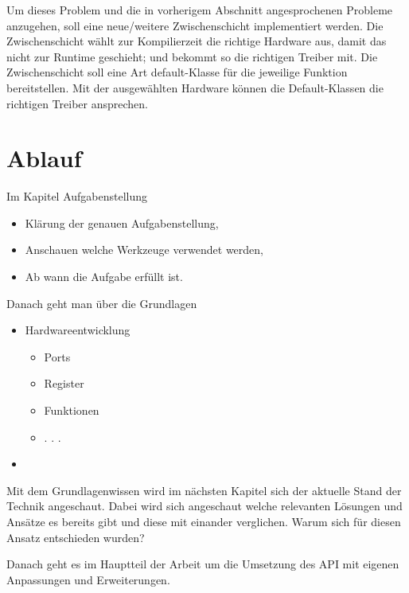 Um dieses Problem und die in vorherigem Abschnitt angesprochenen Probleme anzugehen, soll eine neue/weitere Zwischenschicht implementiert werden. 
Die Zwischenschicht wählt zur Kompilierzeit die richtige Hardware aus, damit das nicht zur Runtime geschieht; und bekommt so die richtigen Treiber mit.
Die Zwischenschicht soll eine Art default-Klasse für die jeweilige Funktion bereitstellen.
Mit der ausgewählten Hardware können die Default-Klassen die richtigen Treiber ansprechen.



\section{Ablauf}
Im Kapitel Aufgabenstellung
	\begin{itemize}
		\item Klärung der genauen Aufgabenstellung,
		\item Anschauen welche Werkzeuge verwendet werden,
		\item Ab wann die Aufgabe erfüllt ist.
	\end{itemize}
	
Danach geht man über die Grundlagen
	\begin{itemize}
		\item Hardwareentwicklung
		\begin{itemize}
			\item Ports
			\item Register
			\item Funktionen
			\item . . .
		\end{itemize}
		\item 
	\end{itemize}

Mit dem Grundlagenwissen wird im nächsten Kapitel sich der aktuelle Stand der Technik angeschaut.
Dabei wird sich angeschaut welche relevanten Lösungen und Ansätze es bereits gibt und diese mit einander verglichen.
Warum sich für diesen Ansatz entschieden wurden?

Danach geht es im Hauptteil der Arbeit um die Umsetzung des API mit eigenen Anpassungen und Erweiterungen.








